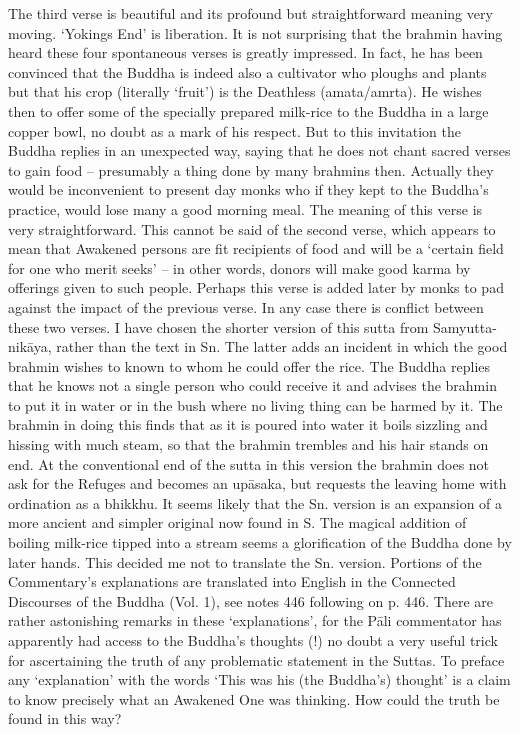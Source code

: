 The third verse is beautiful and its profound but straightforward meaning very moving. `Yokings End' is liberation.
It is not surprising that the brahmin having heard these four spontaneous verses is greatly impressed. In fact, he has been convinced that the Buddha is indeed also a cultivator who ploughs and plants but that his crop (literally `fruit') is the Deathless (amata/amrta). He wishes then to offer some of the specially prepared milk-rice to the Buddha in a large copper bowl, no doubt as a mark of his respect.
But to this invitation the Buddha replies in an unexpected way, saying that he does not chant sacred verses to gain food – presumably a thing done by many brahmins then. Actually they would be inconvenient to present day monks who if they kept to the Buddha's practice, would lose many a good morning meal. The meaning of this verse is very straightforward.
This cannot be said of the second verse, which appears to mean that Awakened persons are fit recipients of food and will be a `certain field for one who merit seeks' – in other words, donors will make good karma by offerings given to such people. Perhaps this verse is added later by monks to pad against the impact of the previous verse. In any case there is conflict between these two verses.
I have chosen the shorter version of this sutta from Samyutta-nik\=aya, rather than the text in Sn. The latter adds an incident in which the good brahmin wishes to known to whom he could offer the rice. The Buddha replies that he knows not a single person who could receive it and advises the brahmin to put it in water or in the bush where no living thing can be harmed by it. The brahmin in doing this finds that as it is poured into water it boils sizzling and hissing with much steam, so that the brahmin trembles and his hair stands on end. At the conventional end of the sutta in this version the brahmin does not ask for the Refuges and becomes an up\=asaka, but requests the leaving home with ordination as a bhikkhu.
It seems likely that the Sn. version is an expansion of a more ancient and simpler original now found in S. The magical addition of boiling milk-rice tipped into a stream seems a glorification of the Buddha done by later hands. This decided me not to translate the Sn. version.
Portions of the Commentary's explanations are translated into English in the Connected Discourses of the Buddha (Vol. 1), see notes 446 following on p. 446. There are rather astonishing remarks in these `explanations', for the P\=ali commentator has apparently had access to the Buddha's thoughts (!) no doubt a very useful trick for ascertaining the truth of any problematic statement in the Suttas. To preface any `explanation' with the words `This was his (the Buddha's) thought' is a claim to know precisely what an Awakened One was thinking. How could the truth be found in this way?
   
